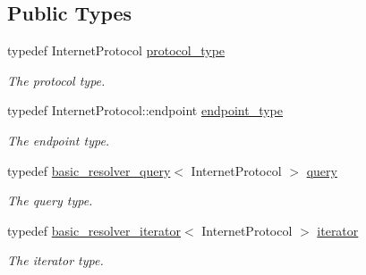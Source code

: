 \subsection*{Public Types}
\begin{DoxyCompactItemize}
\item 
typedef Internet\+Protocol \hyperlink{classasio_1_1ip_1_1basic__resolver_aaf9eccf1df12895a55263a2fc3ea7d8c}{protocol\+\_\+type}
\begin{DoxyCompactList}\small\item\em The protocol type. \end{DoxyCompactList}\item 
typedef Internet\+Protocol\+::endpoint \hyperlink{classasio_1_1ip_1_1basic__resolver_a4623878755f70037e875778a0696da9e}{endpoint\+\_\+type}
\begin{DoxyCompactList}\small\item\em The endpoint type. \end{DoxyCompactList}\item 
typedef \hyperlink{classasio_1_1ip_1_1basic__resolver__query}{basic\+\_\+resolver\+\_\+query}$<$ Internet\+Protocol $>$ \hyperlink{classasio_1_1ip_1_1basic__resolver_ac842e1f99be7849517bcd365fecb423c}{query}
\begin{DoxyCompactList}\small\item\em The query type. \end{DoxyCompactList}\item 
typedef \hyperlink{classasio_1_1ip_1_1basic__resolver__iterator}{basic\+\_\+resolver\+\_\+iterator}$<$ Internet\+Protocol $>$ \hyperlink{classasio_1_1ip_1_1basic__resolver_ad1cc50a31ba4971329a34eb01ef5a21c}{iterator}
\begin{DoxyCompactList}\small\item\em The iterator type. \end{DoxyCompactList}\end{DoxyCompactItemize}
